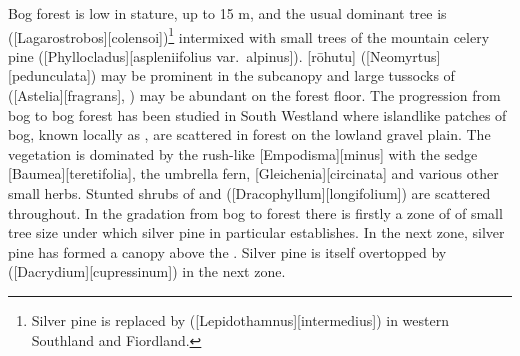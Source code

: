 Bog forest is low in stature, up to 15 m, and the usual dominant tree is  ([Lagarostrobos][colensoi])\footnote{Silver pine is replaced by  ([Lepidothamnus][intermedius]) in western Southland and Fiordland.} intermixed with small trees of the mountain celery pine ([Phyllocladus][aspleniifolius var.\ alpinus]).
[rōhutu] ([Neomyrtus][pedunculata]) may be prominent in the subcanopy and large tussocks of  ([Astelia][fragrans], ) may be abundant on the forest floor.
The progression from bog to bog forest has been studied in South Westland where islandlike patches of bog, known locally as , are scattered in forest on the lowland gravel plain.
The  vegetation is dominated by the rush-like [Empodisma][minus] with the sedge [Baumea][teretifolia], the umbrella fern, [Gleichenia][circinata] and various other small herbs.
Stunted shrubs of  and  ([Dracophyllum][longifolium]) are scattered throughout.
In the gradation from bog to forest there is firstly a zone of  of small tree size under which silver pine in particular establishes.
In the next zone, silver pine has formed a canopy above the .
Silver pine is itself overtopped by  ([Dacrydium][cupressinum]) in the next zone.

